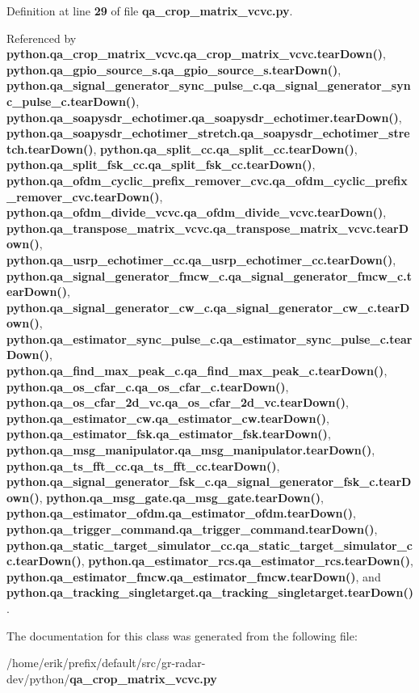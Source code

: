 Definition at line {\bf 29} of file {\bf qa\+\_\+crop\+\_\+matrix\+\_\+vcvc.\+py}.



Referenced by {\bf python.\+qa\+\_\+crop\+\_\+matrix\+\_\+vcvc.\+qa\+\_\+crop\+\_\+matrix\+\_\+vcvc.\+tear\+Down()}, {\bf python.\+qa\+\_\+gpio\+\_\+source\+\_\+s.\+qa\+\_\+gpio\+\_\+source\+\_\+s.\+tear\+Down()}, {\bf python.\+qa\+\_\+signal\+\_\+generator\+\_\+sync\+\_\+pulse\+\_\+c.\+qa\+\_\+signal\+\_\+generator\+\_\+sync\+\_\+pulse\+\_\+c.\+tear\+Down()}, {\bf python.\+qa\+\_\+soapysdr\+\_\+echotimer.\+qa\+\_\+soapysdr\+\_\+echotimer.\+tear\+Down()}, {\bf python.\+qa\+\_\+soapysdr\+\_\+echotimer\+\_\+stretch.\+qa\+\_\+soapysdr\+\_\+echotimer\+\_\+stretch.\+tear\+Down()}, {\bf python.\+qa\+\_\+split\+\_\+cc.\+qa\+\_\+split\+\_\+cc.\+tear\+Down()}, {\bf python.\+qa\+\_\+split\+\_\+fsk\+\_\+cc.\+qa\+\_\+split\+\_\+fsk\+\_\+cc.\+tear\+Down()}, {\bf python.\+qa\+\_\+ofdm\+\_\+cyclic\+\_\+prefix\+\_\+remover\+\_\+cvc.\+qa\+\_\+ofdm\+\_\+cyclic\+\_\+prefix\+\_\+remover\+\_\+cvc.\+tear\+Down()}, {\bf python.\+qa\+\_\+ofdm\+\_\+divide\+\_\+vcvc.\+qa\+\_\+ofdm\+\_\+divide\+\_\+vcvc.\+tear\+Down()}, {\bf python.\+qa\+\_\+transpose\+\_\+matrix\+\_\+vcvc.\+qa\+\_\+transpose\+\_\+matrix\+\_\+vcvc.\+tear\+Down()}, {\bf python.\+qa\+\_\+usrp\+\_\+echotimer\+\_\+cc.\+qa\+\_\+usrp\+\_\+echotimer\+\_\+cc.\+tear\+Down()}, {\bf python.\+qa\+\_\+signal\+\_\+generator\+\_\+fmcw\+\_\+c.\+qa\+\_\+signal\+\_\+generator\+\_\+fmcw\+\_\+c.\+tear\+Down()}, {\bf python.\+qa\+\_\+signal\+\_\+generator\+\_\+cw\+\_\+c.\+qa\+\_\+signal\+\_\+generator\+\_\+cw\+\_\+c.\+tear\+Down()}, {\bf python.\+qa\+\_\+estimator\+\_\+sync\+\_\+pulse\+\_\+c.\+qa\+\_\+estimator\+\_\+sync\+\_\+pulse\+\_\+c.\+tear\+Down()}, {\bf python.\+qa\+\_\+find\+\_\+max\+\_\+peak\+\_\+c.\+qa\+\_\+find\+\_\+max\+\_\+peak\+\_\+c.\+tear\+Down()}, {\bf python.\+qa\+\_\+os\+\_\+cfar\+\_\+c.\+qa\+\_\+os\+\_\+cfar\+\_\+c.\+tear\+Down()}, {\bf python.\+qa\+\_\+os\+\_\+cfar\+\_\+2d\+\_\+vc.\+qa\+\_\+os\+\_\+cfar\+\_\+2d\+\_\+vc.\+tear\+Down()}, {\bf python.\+qa\+\_\+estimator\+\_\+cw.\+qa\+\_\+estimator\+\_\+cw.\+tear\+Down()}, {\bf python.\+qa\+\_\+estimator\+\_\+fsk.\+qa\+\_\+estimator\+\_\+fsk.\+tear\+Down()}, {\bf python.\+qa\+\_\+msg\+\_\+manipulator.\+qa\+\_\+msg\+\_\+manipulator.\+tear\+Down()}, {\bf python.\+qa\+\_\+ts\+\_\+fft\+\_\+cc.\+qa\+\_\+ts\+\_\+fft\+\_\+cc.\+tear\+Down()}, {\bf python.\+qa\+\_\+signal\+\_\+generator\+\_\+fsk\+\_\+c.\+qa\+\_\+signal\+\_\+generator\+\_\+fsk\+\_\+c.\+tear\+Down()}, {\bf python.\+qa\+\_\+msg\+\_\+gate.\+qa\+\_\+msg\+\_\+gate.\+tear\+Down()}, {\bf python.\+qa\+\_\+estimator\+\_\+ofdm.\+qa\+\_\+estimator\+\_\+ofdm.\+tear\+Down()}, {\bf python.\+qa\+\_\+trigger\+\_\+command.\+qa\+\_\+trigger\+\_\+command.\+tear\+Down()}, {\bf python.\+qa\+\_\+static\+\_\+target\+\_\+simulator\+\_\+cc.\+qa\+\_\+static\+\_\+target\+\_\+simulator\+\_\+cc.\+tear\+Down()}, {\bf python.\+qa\+\_\+estimator\+\_\+rcs.\+qa\+\_\+estimator\+\_\+rcs.\+tear\+Down()}, {\bf python.\+qa\+\_\+estimator\+\_\+fmcw.\+qa\+\_\+estimator\+\_\+fmcw.\+tear\+Down()}, and {\bf python.\+qa\+\_\+tracking\+\_\+singletarget.\+qa\+\_\+tracking\+\_\+singletarget.\+tear\+Down()}.



The documentation for this class was generated from the following file\+:\begin{DoxyCompactItemize}
\item 
/home/erik/prefix/default/src/gr-\/radar-\/dev/python/{\bf qa\+\_\+crop\+\_\+matrix\+\_\+vcvc.\+py}\end{DoxyCompactItemize}
